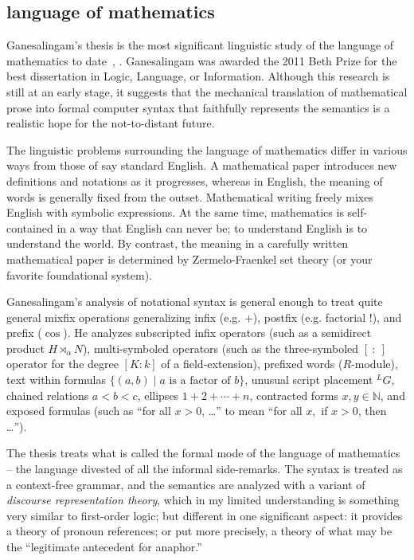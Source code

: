 \documentclass{llncs}
\newcommand{\ring}[1]{\mathbb{#1}}
\begin{document}
\subsection{language of mathematics}


Ganesalingam's thesis is the most significant linguistic study of the
language of mathematics to date~\cite{Gan09}, \cite{Gan10}.
Ganesalingam was awarded the 2011 Beth Prize for the best dissertation
in Logic, Language, or Information.  Although this research is still
at an early stage, it suggests that the mechanical translation of
mathematical prose into formal computer syntax that faithfully
represents the semantics is a realistic hope for the not-to-distant
future.


The linguistic problems surrounding the language of mathematics differ
in various ways from those of say standard English.  A mathematical
paper introduces new definitions and notations as it progresses,
whereas in English, the meaning of words is generally fixed from the
outset.  Mathematical writing freely mixes English with symbolic
expressions.  At the same time, mathematics is self-contained in a way
that English can never be; to understand English is to understand the
world.  By contrast, the meaning in a carefully written mathematical
paper is determined by Zermelo-Fraenkel set theory (or your favorite
foundational system).

Ganesalingam's analysis of notational syntax is general enough to
treat quite general mixfix operations generalizing infix (e.g. +),
postfix (e.g. factorial !), and prefix ($\cos$).  He analyzes
subscripted infix operators (such as a semidirect product
$H\rtimes_\alpha N$), multi-symboled operators (such as the
three-symboled $[~:~]$ operator for the degree $[K:k]$ of a
field-extension), prefixed words ($R$-module), text within formulas
$\{(a,b) \mid a \text{~is a factor of~} b\}$, unusual script placement
${}^LG$, chained relations $a<b<c$, ellipses $1+2+\cdots+n$,
contracted forms $x,y\in\ring{N}$, and exposed formulas (such as ``for
all $x>0$, \dots'' to mean ``for all $x$,~if $x>0$, then \dots'').

The thesis treats what is called the formal mode of the language of
mathematics -- the language divested of all the informal side-remarks.
The syntax is treated as a context-free grammar, and the semantics are
analyzed with a variant of {\it discourse representation theory},
which in my limited understanding is something very similar to
first-order logic; but different in one significant aspect: it
provides a theory of pronoun references; or put more precisely, a
theory of what may be the ``legitimate antecedent for anaphor.''
\end{document}
